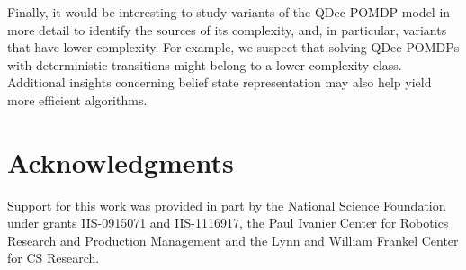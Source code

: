 \documentclass[letterpaper]{article}
\theoremstyle{definition}
\begin{document}
Finally, it would be interesting to study variants of the QDec-POMDP model in more detail to identify the sources of its complexity, and, in particular, variants that have lower complexity. For example, we suspect that solving QDec-POMDPs with deterministic transitions might belong to a lower complexity class. Additional insights concerning belief state representation may also help yield more efficient algorithms.

\section{Acknowledgments}

Support for this work was provided in part by the National Science Foundation under grants IIS-0915071 and IIS-1116917, the Paul Ivanier Center for Robotics Research and Production Management and the Lynn and William Frankel Center for CS Research.





\newpage



\end{document}
